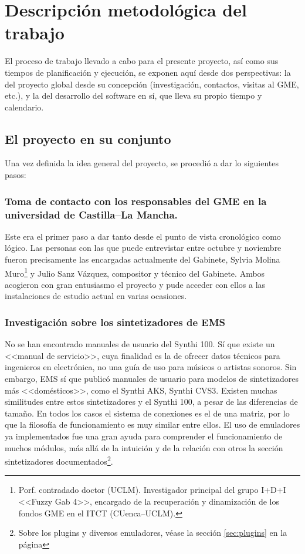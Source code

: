 \chapter{Descripción metodológica del trabajo}

El proceso de trabajo llevado a cabo para el presente proyecto, así como sus tiempos de planificación y ejecución, se exponen aquí desde dos perspectivas: la del proyecto global desde su concepción (investigación, contactos, visitas al GME, etc.), y la del desarrollo del software en sí, que lleva su propio tiempo y calendario. 

\section{El proyecto en su conjunto}

Una vez definida la idea general del proyecto, se procedió a dar lo siguientes pasos:

\subsection{Toma de contacto con los responsables del GME en la universidad de Castilla--La Mancha. }

Este era el primer paso a dar tanto desde el punto de vista cronológico como lógico. Las personas con las que puede entrevistar entre octubre y noviembre fueron precisamente las encargadas actualmente del Gabinete, Sylvia Molina Muro\footnote{Porf. contradado doctor (UCLM). Investigador principal del grupo I+D+I <<Fuzzy Gab 4>>, encargado de la recuperación y dinamización de los fondos GME en el ITCT (CUenca--UCLM).} y Julio Sanz Vázquez, compositor y técnico del Gabinete. Ambos acogieron con gran entusiasmo el proyecto y pude acceder con ellos a las instalaciones de estudio actual en varias ocasiones.

\subsection{Investigación sobre los sintetizadores de EMS}

No se han encontrado manuales de usuario del Synthi 100. Sí que existe un <<manual de servicio>>, cuya finalidad es la de ofrecer datos técnicos para ingenieros en electrónica, no una guía de uso para músicos o artistas sonoros. Sin embargo, EMS sí que publicó manuales de usuario para modelos de sintetizadores más <<domésticos>>, como el Synthi AKS\citeyear{SynthiAKS_brochure}, Synthi CVS3\citeyear{SynthiVCS3_brochure}. Existen muchas similitudes entre estos sintetizadores y el Synthi 100, a pesar de las diferencias de tamaño. En todos los casos el sistema de conexiones es el de una matriz, por lo que la filosofía de funcionamiento es muy similar entre ellos. El uso de emuladores ya implementados fue una gran ayuda para comprender el funcionamiento de muchos módulos, más allá de la intuición y de la relación con otros la sección sintetizadores documentados\footnote{Sobre los plugins y diversos emuladores, véase la sección \ref*{sec:plugins} en la página \pageref{sec:plugins}}.

